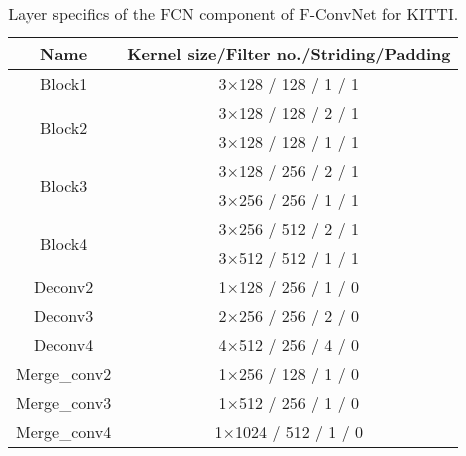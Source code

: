 \documentclass[letterpaper, 10 pt, conference]{ieeeconf}
\begin{document}
\begin{table}[h]
	\begin{center}
	\begin{tabular}{c|c}
		\hline
		Name                    & Kernel size/Filter no./Striding/Padding \\ \hline
		Block1                  & 3$\times$128 / 128 / 1 / 1              \\
		\hline
		\multirow{2}{*}{Block2} & 3$\times$128 / 128 / 2 / 1              \\
		                        & 3$\times$128 / 128 / 1 / 1              \\
		\hline
		\multirow{2}{*}{Block3} & 3$\times$128 / 256 / 2 / 1              \\
		                        & 3$\times$256 / 256 / 1 / 1              \\
		\hline
		\multirow{2}{*}{Block4} & 3$\times$256 / 512 / 2 / 1              \\
		                        & 3$\times$512 / 512 / 1 / 1              \\
		\hline
		Deconv2                 & 1$\times$128 / 256 / 1 / 0              \\
		Deconv3                 & 2$\times$256 / 256 / 2 / 0              \\
		Deconv4                 & 4$\times$512 / 256 / 4 / 0              \\ \hline
		Merge\_conv2            & 1$\times$256 / 128 / 1 / 0              \\
		Merge\_conv3            & 1$\times$512 / 256 / 1 / 0              \\
		Merge\_conv4            & 1$\times$1024 / 512 / 1 / 0             \\
		\hline
	\end{tabular}
	\caption{Layer specifics of the FCN component of F-ConvNet for KITTI. }
	\label{Tab:KITII_SPECIFICS}
	\end{center}
	\vspace{-0.5cm}
\end{table}
\end{document}
